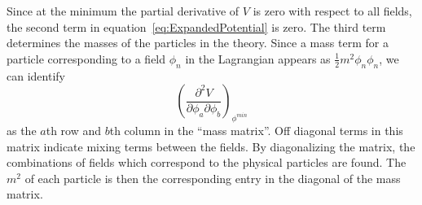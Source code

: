 Since at the minimum the partial derivative of $V$ is zero with respect to all
fields, the second term in equation~\ref{eq:ExpandedPotential} is zero.  The
third term determines the masses of the particles in the theory.  Since a mass
term for a particle corresponding to a field $\phi_n$ in the Lagrangian appears
as $\frac{1}{2}m^2\phi_n\phi_n$, we can identify 
\begin{equation}
\left(\frac {\partial^2
V}{\partial \phi_a \partial \phi_b}\right)_{\phi^{min}}
\label{eq:MassMatrixTerms}
\end{equation}
as the $a$th row and $b$th
column in the ``mass matrix''.  Off diagonal terms in this matrix indicate
mixing terms between the fields.  By diagonalizing the matrix, the combinations
of fields which correspond to the physical particles are found.  The $m^2$ of
each particle is then the corresponding entry in the diagonal of the mass
matrix.

